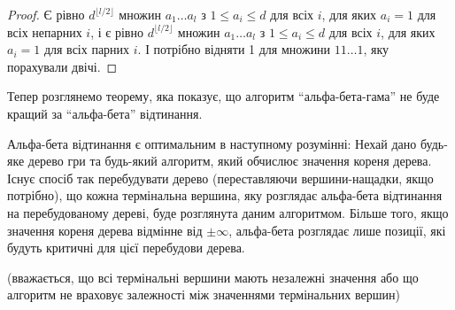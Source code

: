 \documentclass[12pt,a4paper]{article}
\begin{document}
\begin{proof}
  Є рівно $d^{\lfloor l/2 \rfloor}$ множин $a_1\dots a_l$ з $1 \le a_i \le d$
  для всіх $i$, для яких $a_i=1$ для всіх непарних $i$, і є рівно $d^{\lfloor
    l/2 \rfloor}$ множин $a_1\dots a_l$ з $1 \le a_i \le d$ для всіх $i$, для
  яких $a_i=1$ для всіх парних $i$. І потрібно відняти 1 для множини
  $11\dots1$, яку порахували двічі.
\end{proof}

Тепер розглянемо теорему, яка показує, що алгоритм ``альфа-бета-гама'' не буде
кращий за ``альфа-бета'' відтинання.

\begin{thm}
  Альфа-бета відтинання є оптимальним в наступному розумінні: Нехай дано
  будь-яке дерево гри та будь-який алгоритм, який обчислює значення кореня
  дерева. Існує спосіб так перебудувати дерево (переставляючи
  вершини-нащадки, якщо потрібно), що кожна термінальна вершина, яку розглядає
  альфа-бета відтинання на перебудованому дереві, буде розглянута даним
  алгоритмом. Більше того, якщо значення кореня дерева відмінне від
  $\pm\infty$, альфа-бета розглядає лише позиції, які будуть критичні для цієї
  перебудови дерева.

  (вважається, що всі термінальні вершини мають незалежні значення або що
  алгоритм не враховує залежності між значеннями термінальних вершин)
\end{thm}
\end{document}
